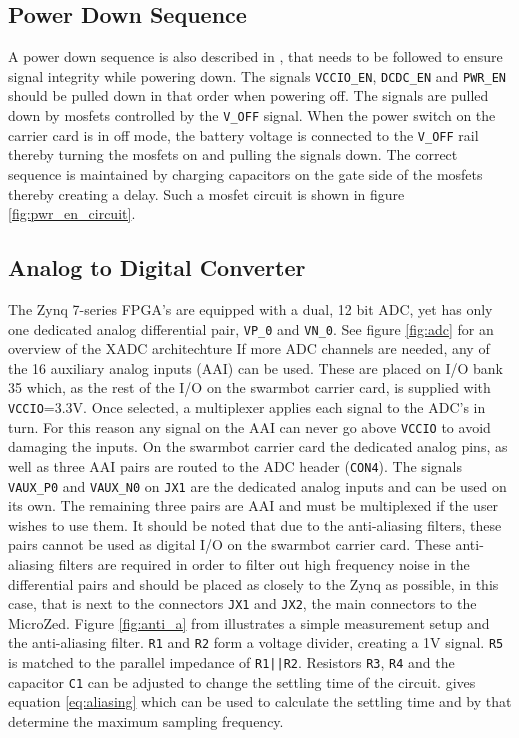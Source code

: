 \subsection{Power Down Sequence} %
\label{sub:power_down_sequence}
A power down sequence is also described in \cite{design_carrier}, that needs to be followed to ensure signal integrity while powering down. 
The signals \texttt{VCCIO\_EN}, \texttt{DCDC\_EN} and \texttt{PWR\_EN} should be pulled down in that order when powering off.
The signals are pulled down by mosfets controlled by the \texttt{V\_OFF} signal.
When the power switch on the carrier card is in off mode, the battery voltage is connected to the \texttt{V\_OFF} rail thereby turning the mosfets on and pulling the signals down. 
The correct sequence is maintained by charging capacitors on the gate side of the mosfets thereby creating a delay.
Such a mosfet circuit is shown in figure \ref{fig:pwr_en_circuit}.
\subsection{Analog to Digital Converter} %
\label{sub:analog_to_digital_converter}
The Zynq 7-series FPGA's are equipped with a dual, 12 bit ADC, yet has only one dedicated analog differential pair, \texttt{VP\_0} and \texttt{VN\_0}.
See figure \ref{fig:adc} for an overview of the XADC architechture
If more ADC channels are needed, any of the 16 auxiliary analog inputs (AAI) can be used.
These are placed on I/O bank 35 which, as the rest of the I/O on the swarmbot carrier card, is supplied with \texttt{VCCIO}=3.3V.
Once selected, a multiplexer applies each signal to the ADC's in turn.
For this reason any signal on the AAI can never go above \texttt{VCCIO} to avoid damaging the inputs.
On the swarmbot carrier card the dedicated analog pins, as well as three AAI pairs are routed to the ADC header (\texttt{CON4}).
The signals \texttt{VAUX\_P0} and \texttt{VAUX\_N0} on \texttt{JX1} are the dedicated analog inputs and can be used on its own.
The remaining three pairs are AAI and must be multiplexed if the user wishes to use them.
It should be noted that due to the anti-aliasing filters, these pairs cannot be used as digital I/O on the swarmbot carrier card.
These anti-aliasing filters are required in order to filter out high frequency noise in the differential pairs and should be placed as closely to the Zynq as possible, in this case, that is next to the connectors \texttt{JX1} and \texttt{JX2}, the main connectors to the MicroZed.
Figure \ref{fig:anti_a} from \cite{adch} illustrates a simple measurement setup and the anti-aliasing filter.
\texttt{R1} and \texttt{R2} form a voltage divider, creating a 1V signal.
\texttt{R5} is matched to the parallel impedance of \texttt{R1||R2}.
Resistors \texttt{R3}, \texttt{R4} and the capacitor \texttt{C1} can be adjusted to change the settling time of the circuit.
\cite{adc} gives equation \ref{eq:aliasing} which can be used to calculate the settling time and by that determine the maximum sampling frequency.

